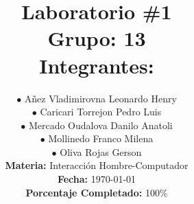 
\newcommand{\NumeroLaboratorio}{1}		%
\newcommand{\PorcentajeCompletado}{100}	%





\title{
\hspace{-0.1cm}\LARGE{Laboratorio \#\NumeroLaboratorio} \\\vspace{0.05cm}
{\large Grupo: 13} \\\vspace{0.2cm}
{\large Integrantes:} \\\vspace{0.2cm}
}

\author{
\hspace{0.5cm}$\bullet$ Añez Vladimirovna Leonardo Henry\\
\hspace{0.5cm}$\bullet$ Caricari Torrejon Pedro Luis\\
\hspace{0.5cm}$\bullet$ Mercado Oudalova Danilo Anatoli\\
\hspace{0.5cm}$\bullet$ Mollinedo Franco Milena\\
\hspace{0.5cm}$\bullet$ Oliva Rojas Gerson \\\vspace{0.2cm}
\textbf{Materia:} Interacción Hombre-Computador \\\vspace{0.2cm}
\textbf{Fecha:} \today \\\vspace{0.2cm}
\textbf{Porcentaje Completado:} \PorcentajeCompletado$\%$
}
\maketitle